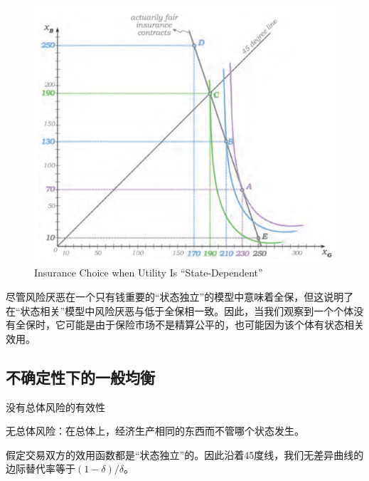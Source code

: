 \documentclass{article}
\begin{document}
\begin{figure}[H] %
	\centering %
	\includegraphics[width=1\textwidth]{17_5} %
	\caption{Insurance Choice when Utility Is “State-Dependent”} %
	\label{Fig.main6} %
\end{figure}

尽管风险厌恶在一个只有钱重要的“状态独立”的模型中意味着全保，但这说明了在“状态相关”模型中风险厌恶与低于全保相一致。因此，当我们观察到一个个体没有全保时，它可能是由于保险市场不是精算公平的，也可能因为该个体有状态相关效用。

\subsection{不确定性下的一般均衡}

没有总体风险的有效性

无总体风险：在总体上，经济生产相同的东西而不管哪个状态发生。

\hspace*{\fill}

假定交易双方的效用函数都是“状态独立”的。因此沿着45度线，我们无差异曲线的边际替代率等于$ (1-\delta)/\delta $。
\end{document}
